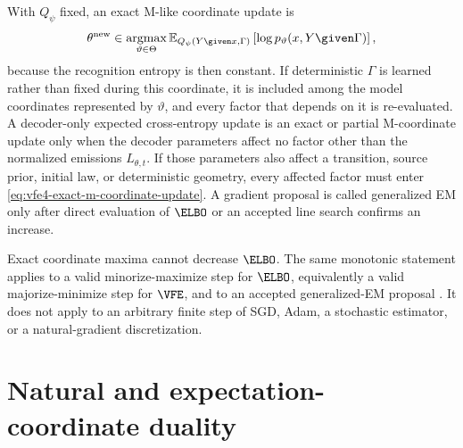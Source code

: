 With $Q_\psi$ fixed, an exact M-like coordinate update is
\begin{equation}
\theta^{\mathrm{new}}
\in\operatorname*{argmax}_{\vartheta\in\Theta}
\mathbb E_{Q_\psi(Y\given x,\Gamma)}
\left[
\log p_\vartheta(x,Y\given\Gamma)
\right],
\label{eq:vfe4-exact-m-coordinate-update}
\end{equation}
because the recognition entropy is then constant. If deterministic $\Gamma$ is learned rather than fixed during this coordinate, it is included among the model coordinates represented by $\vartheta$, and every factor that depends on it is re-evaluated. A decoder-only expected cross-entropy update is an exact or partial M-coordinate update only when the decoder parameters affect no factor other than the normalized emissions $L_{\theta,t}$. If those parameters also affect a transition, source prior, initial law, or deterministic geometry, every affected factor must enter \cref{eq:vfe4-exact-m-coordinate-update}. A gradient proposal is called generalized EM only after direct evaluation of $\ELBO$ or an accepted line search confirms an increase.

Exact coordinate maxima cannot decrease $\ELBO$. The same monotonic statement applies to a valid minorize-maximize step for $\ELBO$, equivalently a valid majorize-minimize step for $\VFE$, and to an accepted generalized-EM proposal \citep{Dempster1977,Neal1998}. It does not apply to an arbitrary finite step of SGD, Adam, a stochastic estimator, or a natural-gradient discretization.

\section{Natural and expectation-coordinate duality}

